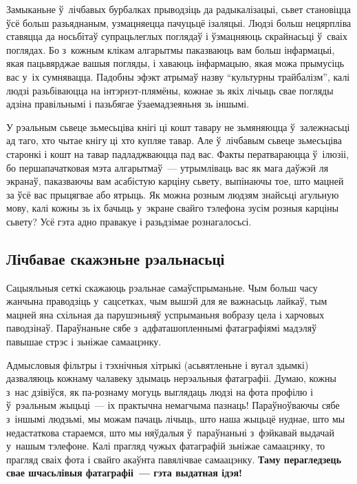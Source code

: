 
Замыканьне ў~лічбавых бурбалках прыводзіць да радыкалізацыі, сьвет становіцца ўсё больш разьяднаным, узмацняецца пачуцьцё ізаляцыі. Людзі больш нецярпліва ставяцца да носьбітаў супрацьлеглых поглядаў і ўзмацняюць скрайнасьці ў~сваіх поглядах. Бо з~кожным клікам алгарытмы паказваюць вам больш інфармацыі, якая пацьвярджае вашыя погляды, і хаваюць інфармацыю, якая можа прымусіць вас у~іх сумнявацца. Падобны эфэкт атрымаў назву ``культурны трайбалізм'', калі людзі разьбіваюцца на інтэрнэт-плямёны, кожнае зь якіх лічыць свае погляды адзіна правільнымі і пазьбягае ўзаемадзеяньня зь іншымі.

У рэальным сьвеце зьмесьціва кнігі ці кошт тавару не зьмяняюцца ў~залежнасьці ад таго, хто чытае кнігу ці хто купляе тавар. Але ў~лічбавым сьвеце зьмесьціва старонкі і кошт на тавар падладжваюцца пад вас. Факты ператвараюцца ў~ілюзіі, бо першапачатковая мэта алгарытмаў~--- утрымліваць вас як мага даўжэй ля экранаў, паказваючы вам асабістую карціну сьвету, выпінаючы тое, што мацней за ўсё вас прыцягвае або ятрыць. Як можна розным людзям знайсьці агульную мову, калі кожны зь іх бачыць у~экране свайго тэлефона зусім розныя карціны сьвету? Усё гэта адно правакуе і разьдзімае рознагалосьсі.

\subsection*{Лічбавае скажэньне рэальнасьці}

Сацыяльныя сеткі скажаюць рэальнае самаўспрыманьне. Чым больш часу жанчына праводзіць у~сацсетках, чым вышэй для яе важнасьць лайкаў, тым мацней яна схільная да парушэньняў успрыманьня вобразу цела і харчовых паводзінаў. Параўнаньне сябе з~адфаташопленнымі фатаграфіямі мадэляў павышае стрэс і зьніжае самаацэнку.

Адмысловыя фільтры і тэхнічныя хітрыкі (асьвятленьне і вугал здымкі) дазваляюць кожнаму чалавеку здымаць нерэальныя фатаграфіі. Думаю, кожны з~нас дзівіўся, як па-рознаму могуць выглядаць людзі на фота профілю і ў~рэальным жыцьці~--- іх практычна немагчыма пазнаць! Параўноўваючы сябе з~іншымі людзьмі, мы можам пачаць лічыць, што наша жыцьцё нуднае, што мы недастаткова стараемся, што мы няўдалыя ў~параўнаньні з~фэйкавай выдачай у~нашым тэлефоне. Калі прагляд чужых фатаграфій зьніжае самаацэнку, то прагляд сваіх фота і свайго акаўнта павялічвае самаацэнку. \textbf{Таму перагледзець свае шчасьлівыя фатаграфіі~--- гэта выдатная ідэя!}

